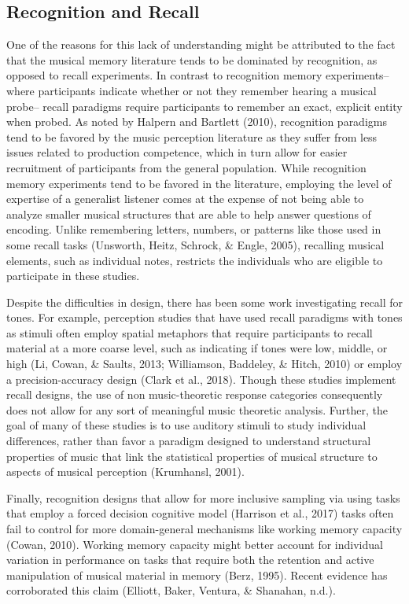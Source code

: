 \documentclass[english,man,floatsintext]{apa6}
\begin{document}
\hypertarget{recognition-and-recall}{%
\subsection{Recognition and Recall}\label{recognition-and-recall}}

One of the reasons for this lack of understanding might be attributed to the fact that the musical memory literature tends to be dominated by recognition, as opposed to recall experiments.
In contrast to recognition memory experiments-- where participants indicate whether or not they remember hearing a musical probe-- recall paradigms require participants to remember an exact, explicit entity when probed.
As noted by Halpern and Bartlett (2010), recognition paradigms tend to be favored by the music perception literature as they suffer from less issues related to production competence, which in turn allow for easier recruitment of participants from the general population.
While recognition memory experiments tend to be favored in the literature, employing the level of expertise of a generalist listener comes at the expense of not being able to analyze smaller musical structures that are able to help answer questions of encoding.
Unlike remembering letters, numbers, or patterns like those used in some recall tasks (Unsworth, Heitz, Schrock, \& Engle, 2005), recalling musical elements, such as individual notes, restricts the individuals who are eligible to participate in these studies.

Despite the difficulties in design, there has been some work investigating recall for tones.
For example, perception studies that have used recall paradigms with tones as stimuli often employ spatial metaphors that require participants to recall material at a more coarse level, such as indicating if tones were low, middle, or high (Li, Cowan, \& Saults, 2013; Williamson, Baddeley, \& Hitch, 2010) or employ a precision-accuracy design (Clark et al., 2018).
Though these studies implement recall designs, the use of non music-theoretic response categories consequently does not allow for any sort of meaningful music theoretic analysis.
Further, the goal of many of these studies is to use auditory stimuli to study individual differences, rather than favor a paradigm designed to understand structural properties of music that link the statistical properties of musical structure to aspects of musical perception (Krumhansl, 2001).

Finally, recognition designs that allow for more inclusive sampling via using tasks that employ a forced decision cognitive model (Harrison et al., 2017) tasks often fail to control for more domain-general mechanisms like working memory capacity (Cowan, 2010).
Working memory capacity might better account for individual variation in performance on tasks that require both the retention and active manipulation of musical material in memory (Berz, 1995).
Recent evidence has corroborated this claim (Elliott, Baker, Ventura, \& Shanahan, n.d.).
\end{document}
